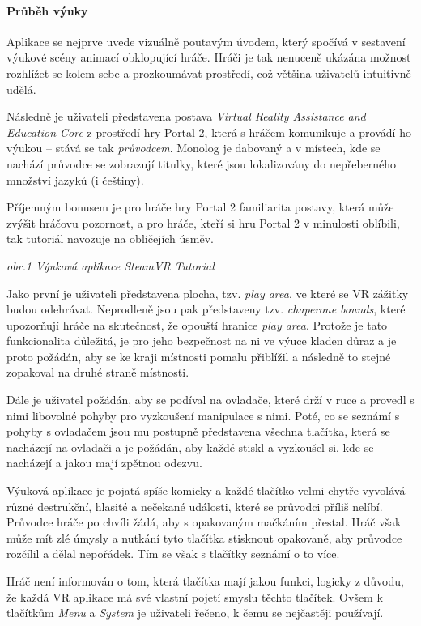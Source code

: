 \paragraph{Průběh výuky}\label{prux16fbux11bh-vuxfduky}

Aplikace se nejprve uvede vizuálně poutavým úvodem, který spočívá v
sestavení výukové scény animací obklopující hráče. Hráči je tak nenuceně
ukázána možnost rozhlížet se kolem sebe a prozkoumávat prostředí, což
většina uživatelů intuitivně udělá.

Následně je uživateli představena postava \emph{Virtual Reality
Assistance and Education Core} z prostředí hry Portal 2, která s hráčem
komunikuje a provádí ho výukou -- stává se tak \emph{průvodcem}. Monolog
je dabovaný a v místech, kde se nachází průvodce se zobrazují titulky,
které jsou lokalizovány do nepřeberného množství jazyků (i češtiny).

Příjemným bonusem je pro hráče hry Portal 2 familiarita postavy, která
může zvýšit hráčovu pozornost, a pro hráče, kteří si hru Portal 2 v
minulosti oblíbili, tak tutoriál navozuje na obličejích úsměv.


\emph{obr.1 Výuková aplikace SteamVR Tutorial}

Jako první je uživateli představena plocha, tzv. \emph{play area}, ve
které se VR zážitky budou odehrávat. Neprodleně jsou pak představeny
tzv. \emph{chaperone bounds}, které upozorňují hráče na skutečnost, že
opouští hranice \emph{play area}. Protože je tato funkcionalita
důležitá, je pro jeho bezpečnost na ni ve výuce kladen důraz a je proto
požádán, aby se ke kraji místnosti pomalu přiblížil a následně to stejné
zopakoval na druhé straně místnosti.

Dále je uživatel požádán, aby se podíval na ovladače, které drží v ruce
a provedl s nimi libovolné pohyby pro vyzkoušení manipulace s nimi.
Poté, co se seznámí s pohyby s ovladačem jsou mu postupně představena
všechna tlačítka, která se nacházejí na ovladači a je požádán, aby každé
stiskl a vyzkoušel si, kde se nacházejí a jakou mají zpětnou odezvu.

Výuková aplikace je pojatá spíše komicky a každé tlačítko velmi chytře
vyvolává různé destrukční, hlasité a nečekané události, které se
průvodci příliš nelíbí. Průvodce hráče po chvíli žádá, aby s opakovaným
mačkáním přestal. Hráč však může mít zlé úmysly a nutkání tyto tlačítka
stisknout opakovaně, aby průvodce rozčílil a dělal nepořádek. Tím se
však s tlačítky seznámí o to více.

Hráč není informován o tom, která tlačítka mají jakou funkci, logicky z
důvodu, že každá VR aplikace má své vlastní pojetí smyslu těchto
tlačítek. Ovšem k tlačítkům \emph{Menu} a \emph{System} je uživateli
řečeno, k čemu se nejčastěji používají.


